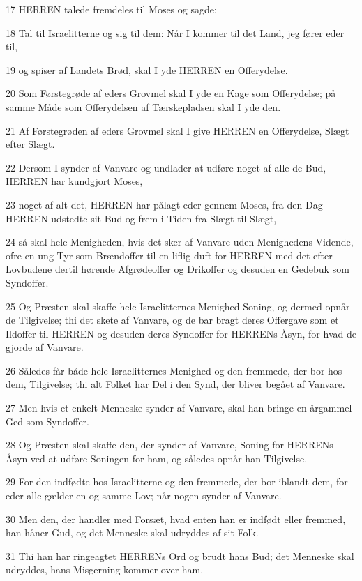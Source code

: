 \par 17 HERREN talede fremdeles til Moses og sagde:
\par 18 Tal til Israelitterne og sig til dem: Når I kommer til det Land, jeg fører eder til,
\par 19 og spiser af Landets Brød, skal I yde HERREN en Offerydelse.
\par 20 Som Førstegrøde af eders Grovmel skal I yde en Kage som Offerydelse; på samme Måde som Offerydelsen af Tærskepladsen skal I yde den.
\par 21 Af Førstegrøden af eders Grovmel skal I give HERREN en Offerydelse, Slægt efter Slægt.
\par 22 Dersom I synder af Vanvare og undlader at udføre noget af alle de Bud, HERREN har kundgjort Moses,
\par 23 noget af alt det, HERREN har pålagt eder gennem Moses, fra den Dag HERREN udstedte sit Bud og frem i Tiden fra Slægt til Slægt,
\par 24 så skal hele Menigheden, hvis det sker af Vanvare uden Menighedens Vidende, ofre en ung Tyr som Brændoffer til en liflig duft for HERREN med det efter Lovbudene dertil hørende Afgrødeoffer og Drikoffer og desuden en Gedebuk som Syndoffer.
\par 25 Og Præsten skal skaffe hele Israelitternes Menighed Soning, og dermed opnår de Tilgivelse; thi det skete af Vanvare, og de bar bragt deres Offergave som et Ildoffer til HERREN og desuden deres Syndoffer for HERRENs Åsyn, for hvad de gjorde af Vanvare.
\par 26 Således får både hele Israelitternes Menighed og den fremmede, der bor hos dem, Tilgivelse; thi alt Folket har Del i den Synd, der bliver begået af Vanvare.
\par 27 Men hvis et enkelt Menneske synder af Vanvare, skal han bringe en årgammel Ged som Syndoffer.
\par 28 Og Præsten skal skaffe den, der synder af Vanvare, Soning for HERRENs Åsyn ved at udføre Soningen for ham, og således opnår han Tilgivelse.
\par 29 For den indfødte hos Israelitterne og den fremmede, der bor iblandt dem, for eder alle gælder en og samme Lov; når nogen synder af Vanvare.
\par 30 Men den, der handler med Forsæt, hvad enten han er indfødt eller fremmed, han håner Gud, og det Menneske skal udryddes af sit Folk.
\par 31 Thi han har ringeagtet HERRENs Ord og brudt hans Bud; det Menneske skal udryddes, hans Misgerning kommer over ham.
